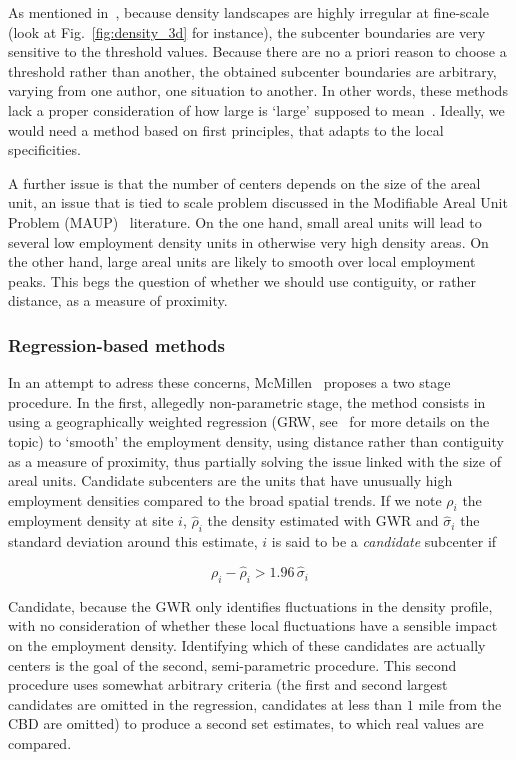As mentioned in~\cite{Anas:1998}, because density landscapes are highly
irregular at fine-scale (look at Fig.~\ref{fig:density_3d} for instance), the
subcenter boundaries are very sensitive to the threshold values. Because there
are no a priori reason to choose a threshold rather than another, the obtained
subcenter boundaries are arbitrary, varying from one author, one situation to
another. In other words, these methods lack a proper consideration of how large is `large' supposed to mean~\cite{McMillen:2003}.
Ideally, we would need a method based on first principles, that adapts to the
local specificities.

A further issue is that the number of centers depends on the size of the areal unit, an
issue that is tied to scale problem discussed in the Modifiable Areal Unit
Problem (MAUP)~\cite{Openshaw:1984} literature. On the one hand, small areal units will
lead to several low employment density units in otherwise very high density
areas. On the other hand, large areal units are likely to smooth over local
employment peaks. This begs the question of whether we should use contiguity, or
rather distance, as a measure of proximity.\\


\subsubsection{Regression-based methods}
\label{ssub:regression_based_methods}

In an attempt to adress these concerns, McMillen~\cite{McMillen:2001} proposes a two stage
procedure. In the first, allegedly non-parametric stage, the method consists in using a
geographically weighted regression (GRW, see~\cite{Brunsdon:1998} for more details on
the topic) to `smooth' the employment density, using distance rather
than contiguity as a measure of proximity, thus partially solving the issue
linked with the size of areal units. 
Candidate subcenters are the units that have unusually high employment densities
compared to the broad spatial trends.  If we note $\rho_i$ the employment
density at site $i$, $\hat{\rho}_i$ the density estimated with GWR and
$\hat{\sigma}_i$ the standard deviation around this estimate, $i$ is said to be
a \emph{candidate} subcenter if 

\begin{equation*}
    \rho_i - \hat{\rho}_i > 1.96\,\hat{\sigma}_i
\end{equation*}

Candidate, because the GWR only identifies fluctuations in the density profile,
with no consideration of whether these local fluctuations have a sensible impact
on the employment density.  Identifying which of these candidates are actually
centers is the goal of the second, semi-parametric procedure. This second
procedure uses somewhat arbitrary criteria (the first and second largest
candidates are omitted in the regression, candidates at less than $1$ mile from
the CBD are omitted) to produce a second set estimates, to which real values are
compared.\\


